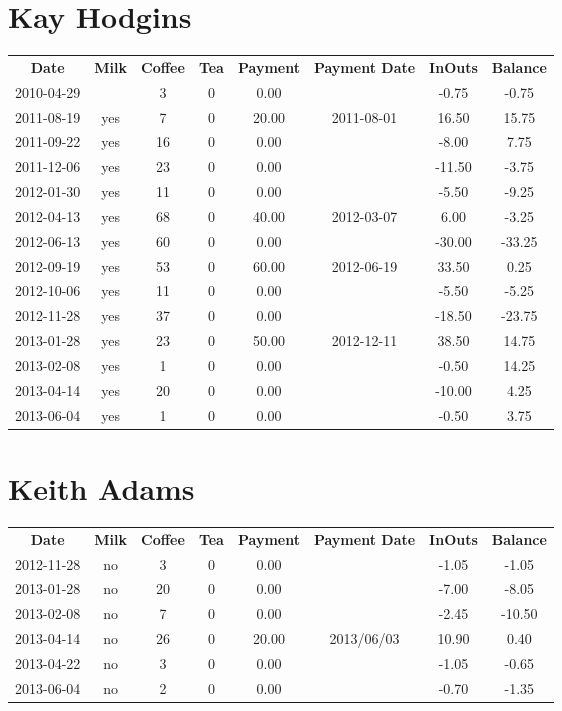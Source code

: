 \section{Kay Hodgins}

\begin{center}
\begin{tabular}{cccccccc}
\textbf{Date} & \textbf{Milk} & \textbf{Coffee} & \textbf{Tea} & \textbf{Payment} & \textbf{Payment Date} & \textbf{InOuts} & \textbf{Balance} \\
2010-04-29 &  &  3 & 0 &  0.00 &  &  -0.75 &  -0.75\\ 
2011-08-19 & yes &  7 & 0 & 20.00 & 2011-08-01 &  16.50 &  15.75\\ 
2011-09-22 & yes & 16 & 0 &  0.00 &  &  -8.00 &   7.75\\ 
2011-12-06 & yes & 23 & 0 &  0.00 &  & -11.50 &  -3.75\\ 
2012-01-30 & yes & 11 & 0 &  0.00 &  &  -5.50 &  -9.25\\ 
2012-04-13 & yes & 68 & 0 & 40.00 & 2012-03-07 &   6.00 &  -3.25\\ 
2012-06-13 & yes & 60 & 0 &  0.00 &  & -30.00 & -33.25\\ 
2012-09-19 & yes & 53 & 0 & 60.00 & 2012-06-19 &  33.50 &   0.25\\ 
2012-10-06 & yes & 11 & 0 &  0.00 &  &  -5.50 &  -5.25\\ 
2012-11-28 & yes & 37 & 0 &  0.00 &  & -18.50 & -23.75\\ 
2013-01-28 & yes & 23 & 0 & 50.00 & 2012-12-11 &  38.50 &  14.75\\ 
2013-02-08 & yes &  1 & 0 &  0.00 &  &  -0.50 &  14.25\\ 
2013-04-14 & yes & 20 & 0 &  0.00 &  & -10.00 &   4.25\\ 
2013-06-04 & yes &  1 & 0 &  0.00 &  &  -0.50 &   3.75
\end{tabular}
\end{center}

\section{Keith Adams}

\begin{center}
\begin{tabular}{cccccccc}
\textbf{Date} & \textbf{Milk} & \textbf{Coffee} & \textbf{Tea} & \textbf{Payment} & \textbf{Payment Date} & \textbf{InOuts} & \textbf{Balance} \\
2012-11-28 & no &  3 & 0 &  0.00 &  & -1.05 &  -1.05\\ 
2013-01-28 & no & 20 & 0 &  0.00 &  & -7.00 &  -8.05\\ 
2013-02-08 & no &  7 & 0 &  0.00 &  & -2.45 & -10.50\\ 
2013-04-14 & no & 26 & 0 & 20.00 & 2013/06/03 & 10.90 &   0.40\\ 
2013-04-22 & no &  3 & 0 &  0.00 &  & -1.05 &  -0.65\\ 
2013-06-04 & no &  2 & 0 &  0.00 &  & -0.70 &  -1.35
\end{tabular}
\end{center}

